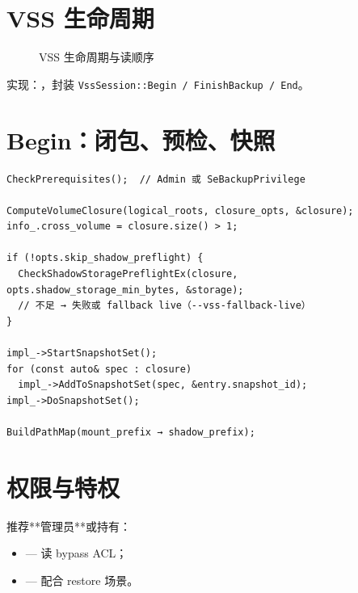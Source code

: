 \section{VSS 生命周期}

\begin{figure}[htbp]
\centering
{}
\caption{VSS 生命周期与读顺序}
\end{figure}

实现：，封装 \texttt{VssSession::Begin / FinishBackup / End}。

\section{Begin：闭包、预检、快照}

\begin{lstlisting}[caption={VssSession::Begin 核心 (vss\_session.cc)}]
CheckPrerequisites();  // Admin 或 SeBackupPrivilege

ComputeVolumeClosure(logical_roots, closure_opts, &closure);
info_.cross_volume = closure.size() > 1;

if (!opts.skip_shadow_preflight) {
  CheckShadowStoragePreflightEx(closure, opts.shadow_storage_min_bytes, &storage);
  // 不足 → 失败或 fallback live（--vss-fallback-live）
}

impl_->StartSnapshotSet();
for (const auto& spec : closure)
  impl_->AddToSnapshotSet(spec, &entry.snapshot_id);
impl_->DoSnapshotSet();

BuildPathMap(mount_prefix → shadow_prefix);
\end{lstlisting}

\section{权限与特权}

推荐**管理员**或持有：
\begin{itemize}[nosep]
  \item {} — 读 bypass ACL；
  \item {} — 配合 restore 场景。
\end{itemize}

